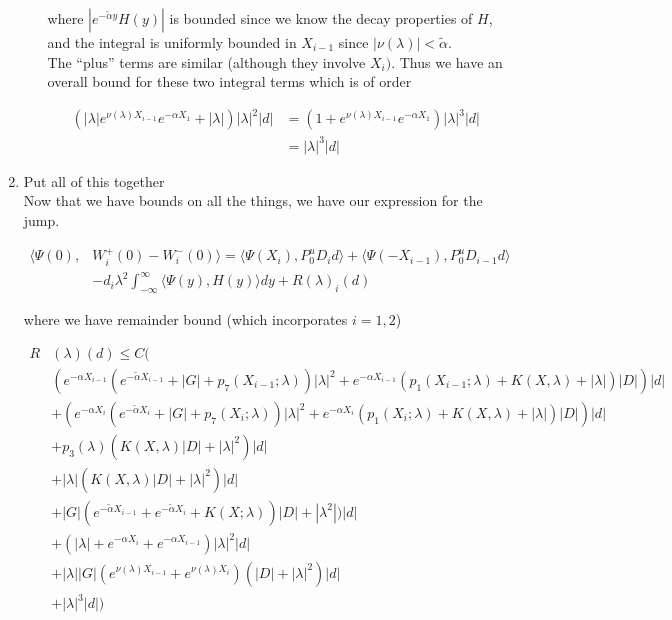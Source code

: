 \documentclass[12pt]{article}
\begin{document}
\begin{enumerate}
\begin{enumerate}
where $|e^{-\tilde{\alpha} y} H(y)|$ is bounded since we know the decay properties of $H$, and the integral is uniformly bounded in $X_{i-1}$ since $|\nu(\lambda)| < \tilde{\alpha}$. \\

The ``plus'' terms are similar (although they involve $X_i)$. Thus we have an overall bound for these two integral terms which is of order

\begin{align*}
(|\lambda| e^{\nu(\lambda)X_{i-1}} e^{-\alpha X_1} + |\lambda|)|\lambda|^2 |d|
&= (1 + e^{\nu(\lambda)X_{i-1}} e^{-\alpha X_1})|\lambda|^3 |d| \\
&= |\lambda|^3 |d|
\end{align*}

\end{enumerate}


\item Put all of this together\\

Now that we have bounds on all the things, we have our expression for the jump.

\begin{align*}
\langle \Psi(0), &W_i^+(0) - W_i^-(0) \rangle = 
\langle \Psi(X_i), P^u_0 D_i d \rangle + \langle \Psi(-X_{i-1}), P^u_0 D_{i-1} d \rangle \\
&- d_i \lambda^2 \int_{-\infty}^\infty \langle \Psi(y), H(y) \rangle dy + R(\lambda)_i(d)
\end{align*}

where we have remainder bound (which incorporates $i = 1, 2$)

\begin{align*}
R&(\lambda)(d) \leq C \Big( \\
&(e^{-\alpha X_{i-1}}(e^{-\tilde{\alpha} X_{i-1}} + |G| + p_7(X_{i-1}; \lambda))|\lambda|^2 + e^{-\alpha X_{i-1}}(p_1(X_{i-1}; \lambda) + K(X, \lambda) + |\lambda|) |D|)|d| \\
&+(e^{-\alpha X_i}(e^{-\tilde{\alpha} X_i} + |G| + p_7(X_i; \lambda))|\lambda|^2 + e^{-\alpha X_i}(p_1(X_i; \lambda) + K(X, \lambda) + |\lambda|) |D|)|d|\\
&+ p_3(\lambda) ( K(X, \lambda) |D|+ |\lambda|^2 )|d| \\
&+ |\lambda| ( K(X, \lambda) |D|+ |\lambda|^2 )|d| \\
&+ |G| ( e^{-\tilde{\alpha} X_{i-1}} + e^{-\tilde{\alpha} X_i} + K(X; \lambda))|D| + |\lambda^2|)|d| \\
&+ ( |\lambda| + e^{-\alpha X_i} + e^{-\alpha X_{i-1}} ) |\lambda|^2 |d| \\
&+ |\lambda| |G| (e^{\nu(\lambda)X_{i-1}} + e^{\nu(\lambda)X_i})(|D| + |\lambda|^2 )|d|  \\
&+ |\lambda|^3 |d| \Big)
\end{align*}


\end{enumerate}
\end{document}
